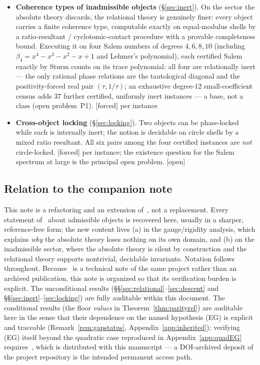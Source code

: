 \documentclass[11pt]{article}
\theoremstyle{plain}
\theoremstyle{definition}
\theoremstyle{remark}
\newcommand{\F}{\textnormal{[forced]}}
\newcommand{\Op}{\textnormal{[open]}}
\begin{document}
\begin{itemize}
  the floor \emph{values} are conditional per Remark~\ref{rem:gapstatus}
\item \textbf{Coherence types of inadmissible objects} (\S\ref{sec:inert}). On the
  sector the absolute theory discards, the relational theory is genuinely finer:
  every object carries a finite coherence type, computable exactly on
  equal-modulus shells by a ratio-resultant / cyclotomic-contact procedure with a
  provable completeness bound. Executing it on four Salem numbers of degrees
  $4,6,8,10$ (including $\beta_4=x^4-x^3-x^2-x+1$ and Lehmer's polynomial),
  each certified Salem exactly by Sturm counts on its trace polynomial: all
  four are relationally inert --- the only rational phase relations are the
  tautological diagonal and the positivity-forced real pair $(\tau,1/\tau)$;
  an exhaustive degree-$12$ small-coefficient census adds $37$ further
  certified, uniformly inert instances --- a base, not a class (open
  problem~P1). \F{} per instance
\item \textbf{Cross-object locking} (\S\ref{sec:locking}). Two objects can be
  phase-locked while each is internally inert; the notion is decidable on circle
  shells by a mixed ratio resultant. All six pairs among the four certified
  instances are \emph{not} circle-locked. \F{} per instance; the existence
  question for the Salem spectrum at large is the principal open problem. \Op
\end{itemize}

\subsection{Relation to the companion note}

This note is a refactoring and an extension of~\cite{CMC}, not a replacement. Every
statement of~\cite{CMC} about admissible objects is recovered here, usually in a
sharper, reference-free form; the new content lives (a) in the gauge/rigidity
analysis, which explains \emph{why} the absolute theory loses nothing on its own
domain, and (b) on the inadmissible sector, where the absolute theory is silent by
construction and the relational theory supports nontrivial, decidable invariants.
Notation follows~\cite{CMC} throughout. Because~\cite{CMC} is a technical
note of the same project rather than an archived publication, this note is
organized so that its verification burden is explicit. The unconditional
results (\S\S\ref{sec:relational}--\ref{sec:descent} and
\S\S\ref{sec:inert}--\ref{sec:locking}) are fully auditable within this
document. The conditional results (the floor \emph{values} in
Theorem~\ref{thm:parityrel}) are auditable here in the sense that their
dependence on the named hypothesis \textup{(EG)} is explicit and traceable
(Remark~\ref{rem:gapstatus}, Appendix~\ref{app:inherited}); verifying
\textup{(EG)} itself beyond the quadratic case reproduced in
Appendix~\ref{app:quadEG} requires~\cite{CMC}, which is distributed with
this manuscript --- a DOI-archived deposit of the project repository is the
intended permanent access path.
\end{document}
